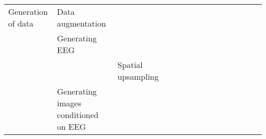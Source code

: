 \begin{tabular}{p{1.5cm}p{1.5cm}p{1.5cm}p{1.5cm}p{0.6cm}p{0.6cm}p{0.6cm}p{0.6cm}p{0.6cm}p{0.6cm}p{0.6cm}p{0.6cm}p{0.6cm}p{0.6cm}p{0.6cm}}
Generation of data & Data augmentation &   &   &                                                             &                                                                                 \cite{Wang2018, Zhang2018b, Schwabedal2018} &                                                                        &                                      &                                                            &                      &                         &                               &                     &                         &                                                                      \\
                                & Generating EEG &   &   &                                                             &                                                                                                                             &                                                                        &                                      &                                                            &  \cite{Hartmann2018} &                         &                               &                     &                         &                                                                      \\
                                &                 & Spatial upsampling &   &                                                             &                                                                                                                             &                                                                        &                                      &                                                            &    \cite{Corley2018} &                         &                               &                     &                         &                                                                      \\
                                & Generating images conditioned on EEG &   &   &                                                             &                                                                                                                             &                                                                        &                                      &                                                            &       \cite{Lee2018} &                         &                               &  \cite{Palazzo2017} &                         &                                                                      \\

\end{tabular}
